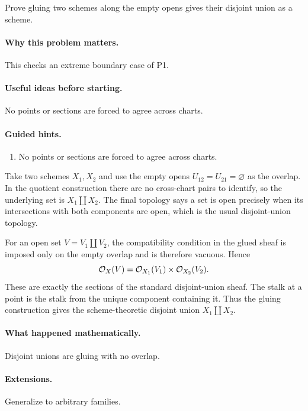 \begin{problem}\label{prob:vi20-p16}
Prove gluing two schemes along the empty opens gives their disjoint union as a scheme.
\end{problem}

\ifdefined\FullProblemDossiers
\paragraph{Why this problem matters.}
This checks an extreme boundary case of P1.

\paragraph{Useful ideas before starting.}
No points or sections are forced to agree across charts.

\paragraph{Guided hints.}
\begin{enumerate}
\item No points or sections are forced to agree across charts.
\end{enumerate}

\begin{solution}
Take two schemes $X_1,X_2$ and use the empty opens $U_{12}=U_{21}=\varnothing$ as the overlap.  In the quotient construction there are no cross-chart pairs to identify, so the underlying set is $X_1\amalg X_2$.  The final topology says a set is open precisely when its intersections with both components are open, which is the usual disjoint-union topology.

For an open set $V=V_1\amalg V_2$, the compatibility condition in the glued sheaf is imposed only on the empty overlap and is therefore vacuous.  Hence
\[
\mathcal O_X(V)=\mathcal O_{X_1}(V_1)\times\mathcal O_{X_2}(V_2).
\]
These are exactly the sections of the standard disjoint-union sheaf.  The stalk at a point is the stalk from the unique component containing it.  Thus the gluing construction gives the scheme-theoretic disjoint union $X_1\amalg X_2$.
\end{solution}


\paragraph{What happened mathematically.}
Disjoint unions are gluing with no overlap.

\paragraph{Extensions.}
Generalize to arbitrary families.
\fi
